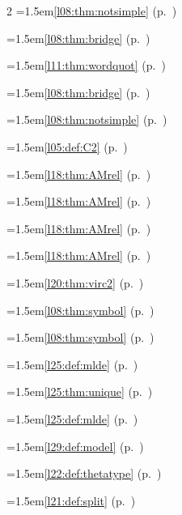 \begin{multicols}{2}
\hangindent=1.5em\quad \ref{l08:thm:notsimple} (p.~\pageref{l08:thm:notsimple})\par
\hangindent=1.5em\quad \ref{l08:thm:bridge} (p.~\pageref{l08:thm:bridge})\par
\hangindent=1.5em\quad \ref{l11:thm:wordquot} (p.~\pageref{l11:thm:wordquot})\par
\hangindent=1.5em\quad \ref{l08:thm:bridge} (p.~\pageref{l08:thm:bridge})\par
\hangindent=1.5em\quad \ref{l08:thm:notsimple} (p.~\pageref{l08:thm:notsimple})\par
\hangindent=1.5em\quad \ref{l05:def:C2} (p.~\pageref{l05:def:C2})\par
\hangindent=1.5em\quad \ref{l18:thm:AMrel} (p.~\pageref{l18:thm:AMrel})\par
\hangindent=1.5em\quad \ref{l18:thm:AMrel} (p.~\pageref{l18:thm:AMrel})\par
\hangindent=1.5em\quad \ref{l18:thm:AMrel} (p.~\pageref{l18:thm:AMrel})\par
\hangindent=1.5em\quad \ref{l18:thm:AMrel} (p.~\pageref{l18:thm:AMrel})\par
\hangindent=1.5em\quad \ref{l20:thm:virc2} (p.~\pageref{l20:thm:virc2})\par
\hangindent=1.5em\quad \ref{l08:thm:symbol} (p.~\pageref{l08:thm:symbol})\par
\hangindent=1.5em\quad \ref{l08:thm:symbol} (p.~\pageref{l08:thm:symbol})\par
\hangindent=1.5em\quad \ref{l25:def:mlde} (p.~\pageref{l25:def:mlde})\par
\hangindent=1.5em\quad \ref{l25:thm:unique} (p.~\pageref{l25:thm:unique})\par
\hangindent=1.5em\quad \ref{l25:def:mlde} (p.~\pageref{l25:def:mlde})\par
\hangindent=1.5em\quad \ref{l29:def:model} (p.~\pageref{l29:def:model})\par
\hangindent=1.5em\quad \ref{l22:def:thetatype} (p.~\pageref{l22:def:thetatype})\par
\hangindent=1.5em\quad \ref{l21:def:split} (p.~\pageref{l21:def:split})\par

\end{multicols}
